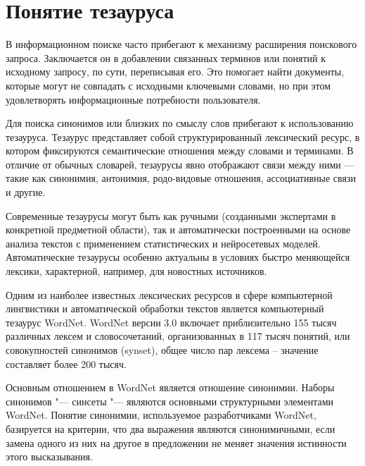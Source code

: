 \documentclass[coursework]{SCWorks}
\begin{document}


\section{Понятие тезауруса}
В информационном поиске часто прибегают к механизму расширения поискового запроса. Заключается он в добавлении связанных терминов или понятий к исходному запросу, по сути, переписывая его. Это помогает найти документы, которые могут не совпадать с исходными ключевыми словами, но при этом удовлетворять информационные потребности пользователя.

Для поиска синонимов или близких по смыслу слов прибегают к использованию тезауруса. Тезаурус представляет собой структурированный лексический ресурс, в котором фиксируются семантические отношения между словами и терминами. В отличие от обычных словарей, тезаурусы явно отображают связи между ними — такие как синонимия, антонимия, родо-видовые отношения, ассоциативные связи и другие.

Современные тезаурусы могут быть как ручными (созданными экспертами в конкретной предметной области), так и автоматически построенными на основе анализа текстов с применением статистических и нейросетевых моделей. Автоматические тезаурусы особенно актуальны в условиях быстро меняющейся лексики, характерной, например, для новостных источников.

Одним из наиболее известных лексических ресурсов в сфере компьютерной 
лингвистики  и автоматической обработки текстов является компьютерный тезаурус WordNet. WordNet версии 3.0  включает приблизительно 155 тысяч различных лексем и словосочетаний, организованных в 117 тысяч понятий, или совокупностей синонимов (synset), общее число пар лексема – значение составляет более 200 тысяч.

Основным отношением в WordNet является отношение синонимии. Наборы 
синонимов "--- синсеты "--- являются основными структурными элементами WordNet.  
Понятие синонимии, используемое разработчиками WordNet, базируется на критерии, что два выражения являются синонимичными, если замена одного из них на другое в предложении не меняет значения истинности этого высказывания.

\end{document}
